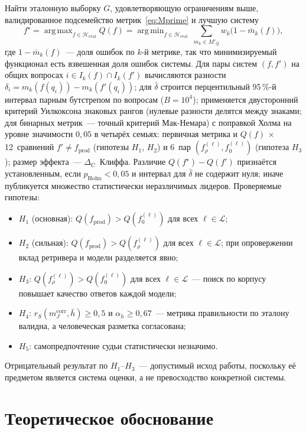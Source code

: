 \documentclass{article}
\newcommand{\Heval}{\mathcal{H}_{\mathrm{eval}}}
\newcommand{\Lm}{\mathcal{L}}
\newcommand{\fprod}{f_{\mathrm{prod}}}
\newcommand{\mcorr}{m_J^{\mathrm{corr}}}
\newcommand{\rS}{r_{S}}
\newcommand{\DC}{\Delta_{\mathrm{C}}}
\newcommand{\MQ}{M'_{Q}}
\DeclareMathOperator*{\argmax}{arg\,max}
\DeclareMathOperator*{\argmin}{arg\,min}
\begin{document}
Найти эталонную выборку $G$, удовлетворяющую ограничениям выше, валидированное подсемейство метрик~\eqref{eq:Mprime} и лучшую систему
\begin{equation}\label{eq:argmax}
  f^\star=\argmax_{f\in\Heval} Q(f)=\argmin_{f\in\Heval}\ \sum_{m_k\in\MQ} w_k\bigl(1-\bar m_k(f)\bigr),
\end{equation}
где $1-\bar m_k(f)$~--- доля ошибок по $k$-й метрике, так что минимизируемый функционал есть взвешенная доля ошибок системы. Для пары систем $(f,f')$ на общих вопросах $i\in I_k(f)\cap I_k(f')$ вычисляются разности $\delta_i=m_k(f(q_i))-m_k(f'(q_i))$; для $\bar\delta$ строится перцентильный 95\,\%-й интервал парным бутстрепом по вопросам ($B=10^4$); применяется двусторонний критерий Уилкоксона знаковых рангов (нулевые разности делятся между знаками; для бинарных метрик~--- точный критерий Мак-Немара) с поправкой Холма на уровне значимости $0{,}05$ в четырёх семьях: первичная метрика и $Q(f)$ $\times$ 12~сравнений $f'\ne\fprod$ (гипотезы $H_1$, $H_2$) и 6~пар $(f_\rho^{(\ell)},f_0^{(\ell)})$ (гипотеза $H_3$); размер эффекта~--- $\DC$~Клиффа. Различие $Q(f^\star)-Q(f')$ признаётся установленным, если $p_{\mathrm{Holm}}<0{,}05$ и интервал для $\bar\delta$ не содержит нуля; иначе публикуется множество статистически неразличимых лидеров. Проверяемые гипотезы:
\begin{itemize}
  \item $H_1$ (основная): $Q(\fprod)>Q(f_0^{(\ell)})$ для всех $\ell\in\Lm$;
  \item $H_2$ (сильная): $Q(\fprod)>Q(f_\rho^{(\ell)})$ для всех $\ell\in\Lm$; при опровержении вклад ретривера и модели разделяется явно;
  \item $H_3$: $Q(f_\rho^{(\ell)})>Q(f_0^{(\ell)})$ для всех $\ell\in\Lm$~--- поиск по корпусу повышает качество ответов каждой модели;
  \item $H_4$: $\rS(\mcorr,\bar h)\ge0{,}5$ и $\alpha_h\ge0{,}67$~--- метрика правильности по эталону валидна, а человеческая разметка согласована;
  \item $H_5$: самопредпочтение судьи статистически незначимо.
\end{itemize}
Отрицательный результат по $H_1$--$H_3$~--- допустимый исход работы, поскольку её предметом является система оценки, а не превосходство конкретной системы.

\section{Теоретическое обоснование}\label{sec:theory}
\end{document}

